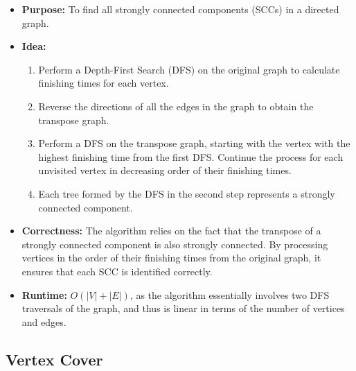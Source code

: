 \documentclass[landscape,7pt]{extarticle}
\begin{document}
\begin{multicols*}{3}
\begin{itemize}
    \item \textbf{Purpose:} To find all strongly connected components (SCCs) in a directed graph.
    \item \textbf{Idea:}
    \begin{enumerate}
        \item Perform a Depth-First Search (DFS) on the original graph to calculate finishing times for each vertex.
        \item Reverse the directions of all the edges in the graph to obtain the transpose graph.
        \item Perform a DFS on the transpose graph, starting with the vertex with the highest finishing time from the first DFS. Continue the process for each unvisited vertex in decreasing order of their finishing times.
        \item Each tree formed by the DFS in the second step represents a strongly connected component.
    \end{enumerate}
    \item \textbf{Correctness:} The algorithm relies on the fact that the transpose of a strongly connected component is also strongly connected. By processing vertices in the order of their finishing times from the original graph, it ensures that each SCC is identified correctly.
    \item \textbf{Runtime:} $O(|V| + |E|)$, as the algorithm essentially involves two DFS traversals of the graph, and thus is linear in terms of the number of vertices and edges.
\end{itemize}

\subsection*{Vertex Cover}


\end{multicols*}
\end{document}
